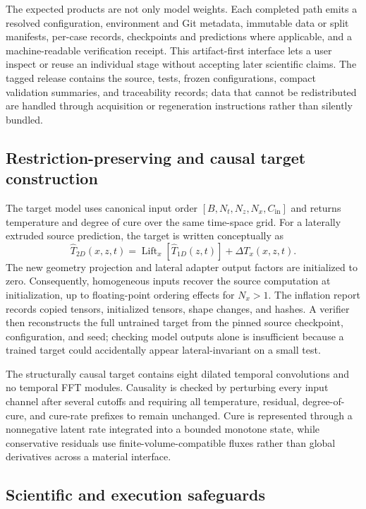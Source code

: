 \documentclass[preprint,12pt]{elsarticle}
\begin{document}
The expected products are not only model weights. Each completed path emits a
resolved configuration, environment and Git metadata, immutable data or split
manifests, per-case records, checkpoints and predictions where applicable, and
a machine-readable verification receipt. This artifact-first interface lets a
user inspect or reuse an individual stage without accepting later scientific
claims. The tagged release contains the source, tests, frozen configurations,
compact validation summaries, and traceability records; data that cannot be
redistributed are handled through acquisition or regeneration instructions
rather than silently bundled.

\subsection{Restriction-preserving and causal target construction}

The target model uses canonical input order
\([B,N_t,N_z,N_x,C_{\mathrm{in}}]\) and returns temperature and degree of
cure over the same time-space grid. For a laterally extruded source prediction,
the target is written conceptually as
\begin{equation}
  \widehat{T}_{2D}(x,z,t)
  = \operatorname{Lift}_{x}\!\left[\widehat{T}_{1D}(z,t)\right]
    + \Delta T_x(x,z,t).
\end{equation}
The new geometry projection and lateral adapter output factors are initialized
to zero. Consequently, homogeneous inputs recover the source computation at
initialization, up to floating-point ordering effects for \(N_x>1\). The
inflation report records copied tensors, initialized tensors, shape changes,
and hashes. A verifier then reconstructs the full untrained target from the
pinned source checkpoint, configuration, and seed; checking model outputs
alone is insufficient because a trained target could accidentally appear
lateral-invariant on a small test.

The structurally causal target contains eight dilated temporal convolutions
and no temporal FFT modules. Causality is checked by perturbing every input
channel after several cutoffs and requiring all temperature, residual,
degree-of-cure, and cure-rate prefixes to remain unchanged. Cure is represented
through a nonnegative latent rate integrated into a bounded monotone state,
while conservative residuals use finite-volume-compatible fluxes rather than
global derivatives across a material interface.

\subsection{Scientific and execution safeguards}
\end{document}
